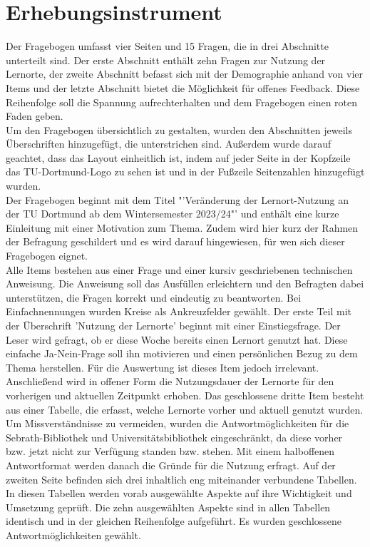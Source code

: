 \documentclass[11pt, a4paper]{article}
\begin{document}
\section{Erhebungsinstrument}
\label{Erhebungsinstrument}
Der Fragebogen umfasst vier Seiten und 15 Fragen, die in drei Abschnitte unterteilt sind. Der erste Abschnitt enthält zehn Fragen zur Nutzung der Lernorte, der zweite Abschnitt befasst sich mit der Demographie anhand von vier Items und der letzte Abschnitt bietet die Möglichkeit für offenes Feedback. Diese Reihenfolge soll die Spannung aufrechterhalten und dem Fragebogen einen roten Faden geben. \\
Um den Fragebogen übersichtlich zu gestalten, wurden den Abschnitten jeweils Überschriften hinzugefügt, die unterstrichen sind. Außerdem wurde darauf geachtet, dass das Layout einheitlich ist, indem auf jeder Seite in der Kopfzeile das TU-Dortmund-Logo zu sehen ist und in der Fußzeile Seitenzahlen hinzugefügt wurden. \\
Der Fragebogen beginnt mit dem Titel "'Veränderung der Lernort-Nutzung an der TU Dortmund ab dem Wintersemester 2023/24"' und enthält eine kurze Einleitung mit einer Motivation zum Thema. Zudem wird hier kurz der Rahmen der Befragung geschildert und es wird darauf hingewiesen, für wen sich dieser Fragebogen eignet.\\
Alle Items bestehen aus einer Frage und einer kursiv geschriebenen technischen Anweisung. Die Anweisung soll das Ausfüllen erleichtern und den Befragten dabei unterstützen, die Fragen korrekt und eindeutig zu beantworten. Bei Einfachnennungen wurden Kreise als Ankreuzfelder gewählt.
Der erste Teil mit der Überschrift 'Nutzung der Lernorte' beginnt mit einer Einstiegsfrage.
Der Leser wird gefragt, ob er diese Woche bereits einen Lernort genutzt hat. Diese einfache Ja-Nein-Frage soll ihn motivieren und einen persönlichen Bezug zu dem Thema herstellen. Für die Auswertung ist dieses Item jedoch irrelevant.\\
Anschließend wird in offener Form die Nutzungsdauer der Lernorte für den vorherigen und aktuellen Zeitpunkt erhoben. Das geschlossene dritte Item besteht aus einer Tabelle, die erfasst, welche Lernorte vorher und aktuell genutzt wurden.
Um Missverständnisse zu vermeiden, wurden die Antwortmöglichkeiten für die Sebrath-Bibliothek und Universitätsbibliothek eingeschränkt, da diese vorher bzw. jetzt nicht zur Verfügung standen bzw. stehen.
Mit einem halboffenen Antwortformat werden danach die Gründe für die Nutzung erfragt.
Auf der zweiten Seite befinden sich drei inhaltlich eng miteinander verbundene Tabellen. In diesen Tabellen werden vorab ausgewählte Aspekte auf ihre Wichtigkeit und Umsetzung geprüft. Die zehn ausgewählten Aspekte sind in allen Tabellen identisch und  in der gleichen Reihenfolge aufgeführt. Es wurden geschlossene Antwortmöglichkeiten gewählt.
\end{document}
